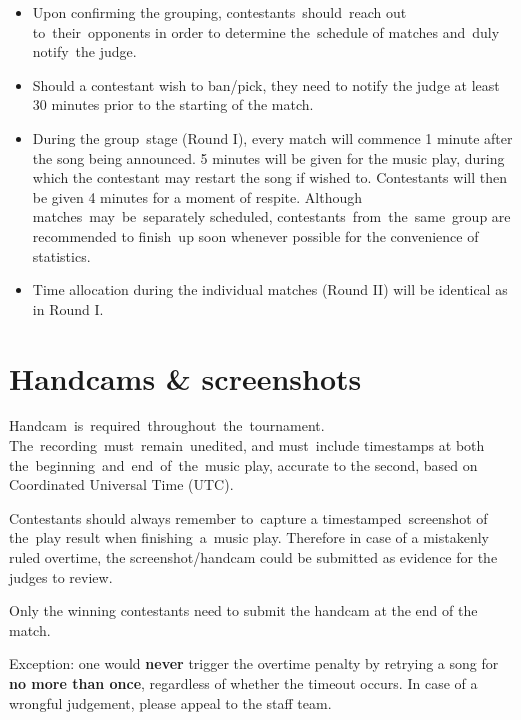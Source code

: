 \documentclass{article}
\begin{document}
\begin{itemize}

	\item Upon confirming the grouping,
	      contestants should reach out to their opponents
	      in order to determine the schedule of matches
	      and duly notify the judge.

	\item Should a contestant wish to ban/pick,
	      they need to notify the judge at least 30 minutes
	      prior to the starting of the match.

	\item During the group stage (Round I),
	      every match will commence 1 minute
	      after the song being announced.
	      5 minutes will be given for the music play,
	      during which the contestant may restart the song if wished to.
	      Contestants will then be given 4 minutes for
	      a moment of respite.
	      Although matches may be separately scheduled,  %
	      contestants from the same group are recommended
	      to finish up soon whenever possible
	      for the convenience of statistics.  %

	\item Time allocation during the individual matches (Round II) will be identical as in Round I.
\end{itemize}

\section{Handcams \& screenshots}

Handcam is required throughout the tournament.
The recording must remain unedited,
and must include timestamps
at both the beginning and end of the music play,
accurate to the second,
based on Coordinated Universal Time (UTC).

Contestants should always remember to capture
a timestamped screenshot of the play result
when finishing a music play.
Therefore in case of a mistakenly ruled overtime,
the screenshot/handcam could be
submitted as evidence for the judges to review.

Only the winning contestants need to submit the handcam
at the end of the match.

Exception: one would \textbf{never}
trigger the overtime penalty
by retrying a song
for \textbf{no more than once},
regardless of whether the timeout occurs.
In case of a wrongful judgement,
please appeal to the staff team.
\end{document}
